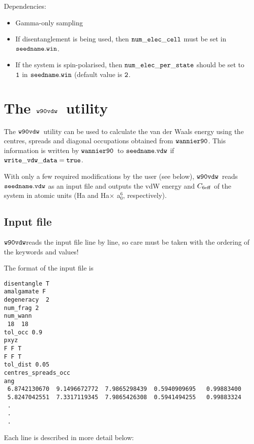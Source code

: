 \documentclass{report}
\newcommand{\wvdw}{{$\tt{w90vdw}$}}
\newcommand{\wannier}{{$\tt{wannier90}$}}
\begin{document}
Dependencies: 
\begin{itemize}
\item Gamma-only sampling
\item If disentanglement is being used, then $\tt{num\_elec\_cell}$
  must be set in $\tt{seedname.win}$.
\item If the system is spin-polarised, then
  $\tt{num\_elec\_per\_state}$ should be set to $\tt{1}$ in
  $\tt{seedname.win}$ (default value is $\tt{2}$.
\end{itemize}


\section{The \wvdw\ utility}
The \wvdw\ utility can be used to calculate the van der Waals energy
using the centres, spreads and diagonal occupations obtained from
\wannier. This information is written by \wannier\ to
$\tt{seedname.vdw}$ if $\tt{write\_vdw\_data = true}$. 
 
With only a few required modifications by the user (see below),
\wvdw\ reads $\tt{seedname.vdw}$ as an input file and outputs 
the vdW energy and $C_{6\rm {eff}}$ of the system in atomic units (Ha
and Ha$\times$ a$_0^6$, respectively).

\subsection{Input file}

\wvdw reads the input file line by line, so care must be taken with
the ordering of the keywords and values! 

The format of the input file is

\begin{verbatim}
disentangle T
amalgamate F
degeneracy  2
num_frag 2
num_wann
 18  18
tol_occ 0.9
pxyz
F F T
F F T
tol_dist 0.05
centres_spreads_occ
ang
 6.8742130670  9.1496672772  7.9865298439  0.5940909695   0.99883400
 5.8247042551  7.3317119345  7.9865426308  0.5941494255   0.99883324
 .
 .
 .
\end{verbatim}

Each line is described in more detail below:
\end{document}
